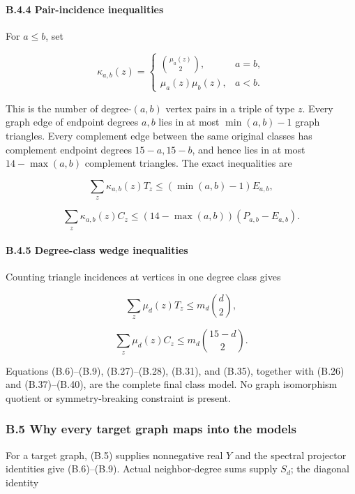 \documentclass[
  english,
  11pt,
  a4paper,
]{article}
\begin{document}
\paragraph{B.4.4 Pair-incidence
inequalities}\label{b.4.4-pair-incidence-inequalities}

For \(a\le b\), set

\[
\kappa_{a,b}(z)=
\begin{cases}
\binom{\mu_a(z)}2,&a=b,\\
\mu_a(z)\mu_b(z),&a<b.
\end{cases}
\tag{B.36}
\]

This is the number of degree-\((a,b)\) vertex pairs in a triple of type
\(z\). Every graph edge of endpoint degrees \(a,b\) lies in at most
\(\min(a,b)-1\) graph triangles. Every complement edge between the same
original classes has complement endpoint degrees \(15-a,15-b\), and
hence lies in at most \(14-\max(a,b)\) complement triangles. The exact
inequalities are

\[
\sum_z\kappa_{a,b}(z)T_z
\le(\min(a,b)-1)E_{a,b},
\tag{B.37}
\]

\[
\sum_z\kappa_{a,b}(z)C_z
\le(14-\max(a,b))(P_{a,b}-E_{a,b}).
\tag{B.38}
\]

\paragraph{B.4.5 Degree-class wedge
inequalities}\label{b.4.5-degree-class-wedge-inequalities}

Counting triangle incidences at vertices in one degree class gives

\[
\sum_z\mu_d(z)T_z\le m_d\binom d2,
\tag{B.39}
\]

\[
\sum_z\mu_d(z)C_z\le m_d\binom{15-d}{2}.
\tag{B.40}
\]

Equations (B.6)--(B.9), (B.27)--(B.28), (B.31), and (B.35), together
with (B.26) and (B.37)--(B.40), are the complete final class model. No
graph isomorphism quotient or symmetry-breaking constraint is present.

\subsubsection{B.5 Why every target graph maps into the
models}\label{b.5-why-every-target-graph-maps-into-the-models}

For a target graph, (B.5) supplies nonnegative real \(Y\) and the
spectral projector identities give (B.6)--(B.9). Actual neighbor-degree
sums supply \(S_d\); the diagonal identity
\end{document}
